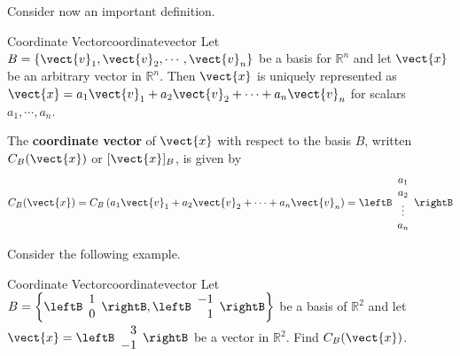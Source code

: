 Consider now an important definition.

\begin{definition}{Coordinate Vector}{coordinatevector}
Let $B = \left\{ \vect{v}_1, \vect{v}_2, \cdots, \vect{v}_n \right\}$
be a basis for $\mathbb{R}^n$ and let $\vect{x}$ be an arbitrary
vector in $\mathbb{R}^n$. Then $\vect{x}$ is uniquely represented as
$\vect{x} = a_1\vect{v}_1 +
a_2\vect{v}_2 + \cdots + a_n\vect{v}_n$ for scalars $a_1, \cdots,
a_n$. 

The  \textbf{coordinate vector} of $\vect{x}$ with respect to the
basis $B$, written $C_B(\vect{x})$ or  $[\vect{x}]_B$,  is given by
\[
C_B(\vect{x}) =  C_B \left( a_1\vect{v}_1 + a_2\vect{v}_2 + \cdots + a_n\vect{v}_n \right) = \leftB
\begin{array}{c}
a_1 \\
a_2 \\
\vdots \\
a_n
\end{array} \rightB
\] 
\end{definition}

Consider the following example.

\begin{example}{Coordinate Vector}{coordinatevector}
Let $B = \left\{ \leftB \begin{array}{r}
1 \\
0 
\end{array} \rightB, \leftB \begin{array}{r}
-1 \\
1
\end{array} \rightB \right\}$ be a basis of $\mathbb{R}^2$ and let $\vect{x} = \leftB
\begin{array}{r}
3 \\
-1
\end{array}
\rightB$ be a vector in $\mathbb{R}^2$. Find $C_B(\vect{x})$. 
\end{example}

